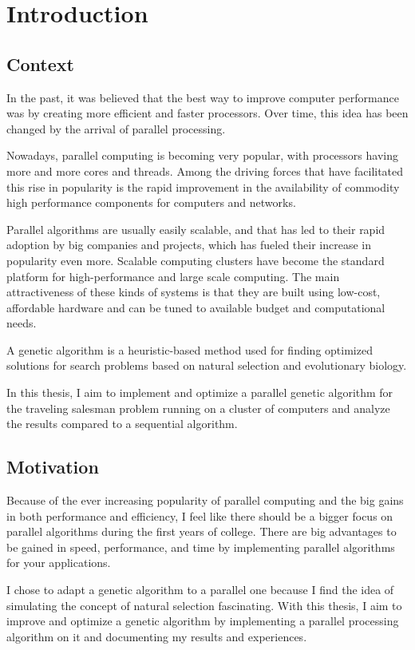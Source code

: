 \chapter*{Introduction} 

\section*{Context}

In the past, it was believed that the best way to improve computer performance was by creating more efficient and faster processors. Over time, this idea has been changed by the arrival of parallel processing.
\par
Nowadays, parallel computing is becoming very popular, with processors having more and more cores and threads. Among the driving forces that have facilitated this rise in popularity is the rapid improvement in the availability of commodity high performance components for computers and networks.
\par
Parallel algorithms are usually easily scalable, and that has led to their rapid adoption by big companies and projects, which has fueled their increase in popularity even more. Scalable computing clusters have become the standard platform for high-performance and large scale computing. The main attractiveness of these kinds of systems is that they are built using low-cost, affordable hardware and can be tuned to available budget and computational needs.
\par
A genetic algorithm is a heuristic-based method used for finding optimized solutions for search problems based on natural selection and evolutionary biology.
\par
In this thesis, I aim to implement and optimize a parallel genetic algorithm for the traveling salesman problem running on a cluster of computers and analyze the results compared to a sequential algorithm.

\pagebreak
\section*{Motivation}

Because of the ever increasing popularity of parallel computing and the big gains in both performance and efficiency, I feel like there should be a bigger focus on parallel algorithms during the first years of college. There are big advantages to be gained in speed, performance, and time by implementing parallel algorithms for your applications.
\par
I chose to adapt a genetic algorithm to a parallel one because I find the idea of simulating the concept of natural selection fascinating.
With this thesis, I aim to improve and optimize a genetic algorithm by implementing a parallel processing algorithm on it and documenting my results and experiences.

